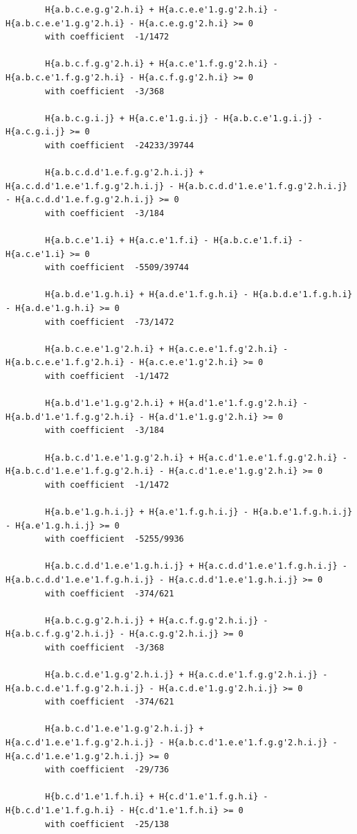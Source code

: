 \documentclass[11pt, a4paper]{kybernetika}
\begin{document}
\begin{verbatim}
		H{a.b.c.e.g.g'2.h.i} + H{a.c.e.e'1.g.g'2.h.i} - H{a.b.c.e.e'1.g.g'2.h.i} - H{a.c.e.g.g'2.h.i} >= 0
		with coefficient  -1/1472
		
		H{a.b.c.f.g.g'2.h.i} + H{a.c.e'1.f.g.g'2.h.i} - H{a.b.c.e'1.f.g.g'2.h.i} - H{a.c.f.g.g'2.h.i} >= 0
		with coefficient  -3/368
		
		H{a.b.c.g.i.j} + H{a.c.e'1.g.i.j} - H{a.b.c.e'1.g.i.j} - H{a.c.g.i.j} >= 0
		with coefficient  -24233/39744
		
		H{a.b.c.d.d'1.e.f.g.g'2.h.i.j} + H{a.c.d.d'1.e.e'1.f.g.g'2.h.i.j} - H{a.b.c.d.d'1.e.e'1.f.g.g'2.h.i.j} - H{a.c.d.d'1.e.f.g.g'2.h.i.j} >= 0
		with coefficient  -3/184
		
		H{a.b.c.e'1.i} + H{a.c.e'1.f.i} - H{a.b.c.e'1.f.i} - H{a.c.e'1.i} >= 0
		with coefficient  -5509/39744
		
		H{a.b.d.e'1.g.h.i} + H{a.d.e'1.f.g.h.i} - H{a.b.d.e'1.f.g.h.i} - H{a.d.e'1.g.h.i} >= 0
		with coefficient  -73/1472
		
		H{a.b.c.e.e'1.g'2.h.i} + H{a.c.e.e'1.f.g'2.h.i} - H{a.b.c.e.e'1.f.g'2.h.i} - H{a.c.e.e'1.g'2.h.i} >= 0
		with coefficient  -1/1472
		
		H{a.b.d'1.e'1.g.g'2.h.i} + H{a.d'1.e'1.f.g.g'2.h.i} - H{a.b.d'1.e'1.f.g.g'2.h.i} - H{a.d'1.e'1.g.g'2.h.i} >= 0
		with coefficient  -3/184
		
		H{a.b.c.d'1.e.e'1.g.g'2.h.i} + H{a.c.d'1.e.e'1.f.g.g'2.h.i} - H{a.b.c.d'1.e.e'1.f.g.g'2.h.i} - H{a.c.d'1.e.e'1.g.g'2.h.i} >= 0
		with coefficient  -1/1472
		
		H{a.b.e'1.g.h.i.j} + H{a.e'1.f.g.h.i.j} - H{a.b.e'1.f.g.h.i.j} - H{a.e'1.g.h.i.j} >= 0
		with coefficient  -5255/9936
		
		H{a.b.c.d.d'1.e.e'1.g.h.i.j} + H{a.c.d.d'1.e.e'1.f.g.h.i.j} - H{a.b.c.d.d'1.e.e'1.f.g.h.i.j} - H{a.c.d.d'1.e.e'1.g.h.i.j} >= 0
		with coefficient  -374/621
		
		H{a.b.c.g.g'2.h.i.j} + H{a.c.f.g.g'2.h.i.j} - H{a.b.c.f.g.g'2.h.i.j} - H{a.c.g.g'2.h.i.j} >= 0
		with coefficient  -3/368
		
		H{a.b.c.d.e'1.g.g'2.h.i.j} + H{a.c.d.e'1.f.g.g'2.h.i.j} - H{a.b.c.d.e'1.f.g.g'2.h.i.j} - H{a.c.d.e'1.g.g'2.h.i.j} >= 0
		with coefficient  -374/621
		
		H{a.b.c.d'1.e.e'1.g.g'2.h.i.j} + H{a.c.d'1.e.e'1.f.g.g'2.h.i.j} - H{a.b.c.d'1.e.e'1.f.g.g'2.h.i.j} - H{a.c.d'1.e.e'1.g.g'2.h.i.j} >= 0
		with coefficient  -29/736
		
		H{b.c.d'1.e'1.f.h.i} + H{c.d'1.e'1.f.g.h.i} - H{b.c.d'1.e'1.f.g.h.i} - H{c.d'1.e'1.f.h.i} >= 0
		with coefficient  -25/138
		

\end{verbatim}
\end{document}
